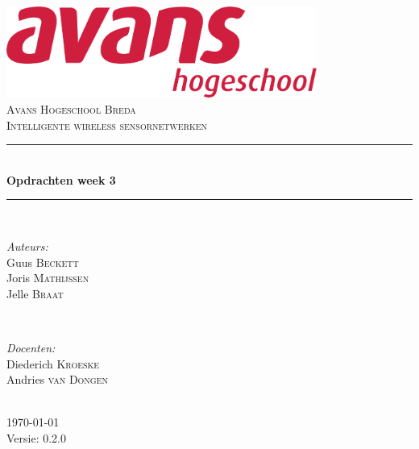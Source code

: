\documentclass[12pt]{article}
\begin{document}
\begin{titlepage}
\newcommand{\HRule}{\rule{\linewidth}{0.5mm}} %

\center %

\includegraphics[height=3cm] {avans}\\%
\textsc{\Large Avans Hogeschool Breda}\\[0.5cm] %
\textsc{\large Intelligente wireless sensornetwerken }\\[0.5cm] %
\HRule \\[0.4cm]
{ \huge \bfseries Opdrachten week 3	}\\[0.4cm] %
\HRule \\[1.5cm]

\begin{minipage}{0.4\textwidth}
\begin{flushleft} \large
\emph{Auteurs:}\\
Guus \textsc{Beckett} \\%
Joris \textsc{Mathijssen}\\
Jelle \textsc{Braat} %
\end{flushleft}
\end{minipage}
~
\begin{minipage}{0.4\textwidth}
\begin{flushright} \large
\emph{Docenten:} \\
Diederich \textsc{Kroeske} \\ %
Andries \textsc{van Dongen} \\ %
\end{flushright}
\end{minipage}\\[4cm]

{\large \today}\\[3cm] %

Versie: 0.2.0

\vfill %

\end{titlepage}
\end{document}
